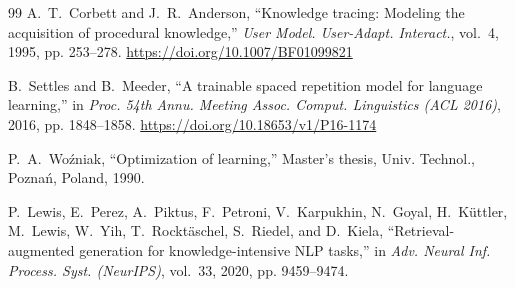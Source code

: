 \documentclass[conference]{IEEEtran}
\begin{document}
\begin{thebibliography}{99}
A.~T.~Corbett and J.~R.~Anderson, ``Knowledge tracing: Modeling the acquisition of procedural knowledge,'' \emph{User Model. User-Adapt. Interact.}, vol.~4, 1995, pp. 253--278. \url{https://doi.org/10.1007/BF01099821}

B.~Settles and B.~Meeder, ``A trainable spaced repetition model for language learning,'' in \emph{Proc. 54th Annu. Meeting Assoc. Comput. Linguistics (ACL 2016)}, 2016, pp. 1848--1858. \url{https://doi.org/10.18653/v1/P16-1174}

P.~A.~Woźniak, ``Optimization of learning,'' Master's thesis, Univ. Technol., Poznań, Poland, 1990.

P.~Lewis, E.~Perez, A.~Piktus, F.~Petroni, V.~Karpukhin, N.~Goyal, H.~Küttler, M.~Lewis, W.~Yih, T.~Rocktäschel, S.~Riedel, and D.~Kiela, ``Retrieval-augmented generation for knowledge-intensive NLP tasks,'' in \emph{Adv. Neural Inf. Process. Syst. (NeurIPS)}, vol.~33, 2020, pp. 9459--9474.

\end{thebibliography}
\end{document}
